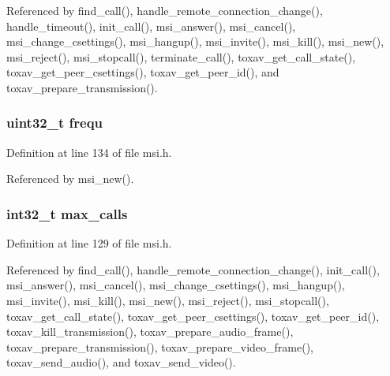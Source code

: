 Referenced by find\+\_\+call(), handle\+\_\+remote\+\_\+connection\+\_\+change(), handle\+\_\+timeout(), init\+\_\+call(), msi\+\_\+answer(), msi\+\_\+cancel(), msi\+\_\+change\+\_\+csettings(), msi\+\_\+hangup(), msi\+\_\+invite(), msi\+\_\+kill(), msi\+\_\+new(), msi\+\_\+reject(), msi\+\_\+stopcall(), terminate\+\_\+call(), toxav\+\_\+get\+\_\+call\+\_\+state(), toxav\+\_\+get\+\_\+peer\+\_\+csettings(), toxav\+\_\+get\+\_\+peer\+\_\+id(), and toxav\+\_\+prepare\+\_\+transmission().

\hypertarget{struct___m_s_i_session_a54c9341406a254204cca6d48dd54cdc8}{
\subsubsection[{frequ}]{\setlength{\rightskip}{0pt plus 5cm}uint32\+\_\+t frequ}}\label{struct___m_s_i_session_a54c9341406a254204cca6d48dd54cdc8}


Definition at line 134 of file msi.\+h.



Referenced by msi\+\_\+new().

\hypertarget{struct___m_s_i_session_ae4bbb4682dc5c74588083ca06ac2f76f}{
\subsubsection[{max\+\_\+calls}]{\setlength{\rightskip}{0pt plus 5cm}int32\+\_\+t max\+\_\+calls}}\label{struct___m_s_i_session_ae4bbb4682dc5c74588083ca06ac2f76f}


Definition at line 129 of file msi.\+h.



Referenced by find\+\_\+call(), handle\+\_\+remote\+\_\+connection\+\_\+change(), init\+\_\+call(), msi\+\_\+answer(), msi\+\_\+cancel(), msi\+\_\+change\+\_\+csettings(), msi\+\_\+hangup(), msi\+\_\+invite(), msi\+\_\+kill(), msi\+\_\+new(), msi\+\_\+reject(), msi\+\_\+stopcall(), toxav\+\_\+get\+\_\+call\+\_\+state(), toxav\+\_\+get\+\_\+peer\+\_\+csettings(), toxav\+\_\+get\+\_\+peer\+\_\+id(), toxav\+\_\+kill\+\_\+transmission(), toxav\+\_\+prepare\+\_\+audio\+\_\+frame(), toxav\+\_\+prepare\+\_\+transmission(), toxav\+\_\+prepare\+\_\+video\+\_\+frame(), toxav\+\_\+send\+\_\+audio(), and toxav\+\_\+send\+\_\+video().

